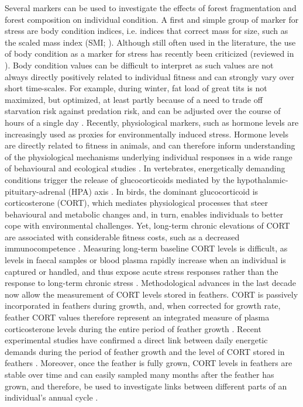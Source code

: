 \documentclass[10pt, twoside]{book} %
\begin{document}
Several markers can be used to investigate the effects of forest fragmentation and forest composition on individual condition. A first and simple group of marker for stress are body condition indices, i.e. indices that correct mass for size, such as the scaled mass index (SMI; \citealt{Peig2009}). Although still often used in the literature, the use of body condition as a marker for stress has recently been criticized (reviewed in \citealt{Wilder2016}). Body condition values can be difficult to interpret as such values are not always directly positively related to individual fitness and can strongly vary over short time-scales. For example, during winter, fat load of great tits is not maximized, but optimized, at least partly because of a need to trade off starvation risk against predation risk, and can be adjusted over the course of hours of a single day \citep{Macleod2005, Gosler1996}. Recently, physiological markers, such as hormone levels are increasingly used as proxies for environmentally induced stress. Hormone levels are directly related to fitness in animals, and can therefore inform understanding of the physiological mechanisms underlying individual responses in a wide range of behavioural and ecological studies \citep{Wilder2016}. In vertebrates, energetically demanding conditions trigger the release of glucocorticoids mediated by the hypothalamic-pituitary-adrenal (HPA) axis \citep{Wingfield2013}. In birds, the dominant glucocorticoid is corticosterone (CORT), which mediates physiological processes that steer behavioural and metabolic changes and, in turn, enables individuals to better cope with environmental challenges. Yet, long-term chronic elevations of CORT are associated with considerable fitness costs, such as a decreased immunocompetence \citep{Wingfield2013, Creel2013}. Measuring long-term baseline CORT levels is difficult, as levels in faecal samples or blood plasma rapidly increase when an individual is captured or handled, and thus expose acute stress responses rather than the response to long-term chronic stress \citep{Romero2002}. Methodological advances in the last decade now allow the measurement of CORT levels stored in feathers. CORT is passively incorporated in feathers during growth, and, when corrected for growth rate, feather CORT values therefore represent an integrated measure of plasma corticosterone levels during the entire period of feather growth \citep{Bortolotti2008, Romero2016}. Recent experimental studies have confirmed a direct link between daily energetic demands during the period of feather growth and the level of CORT stored in feathers \citep{Johns2018}. Moreover, once the feather is fully grown, CORT levels in feathers are stable over time and can easily sampled many months after the feather has grown, and therefore, be used to investigate links between different parts of an individual's annual cycle \citep{Bortolotti2010}.\\ 
\end{document}
